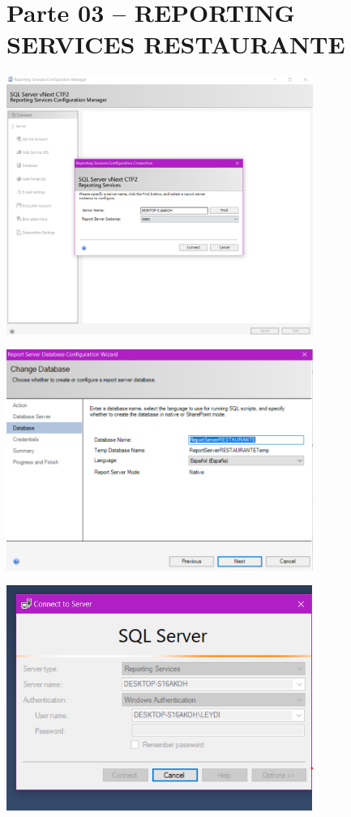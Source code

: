 \section{Parte 03 – REPORTING SERVICES RESTAURANTE} 


	\begin{center}
	\includegraphics[width=10cm]{./Imagenes/ley1} 
	\end{center}

	\begin{center}
	\includegraphics[width=10cm]{./Imagenes/ley2} 
	\end{center}

	\begin{center}
	\includegraphics[width=10cm]{./Imagenes/ley3} 
	\end{center}

